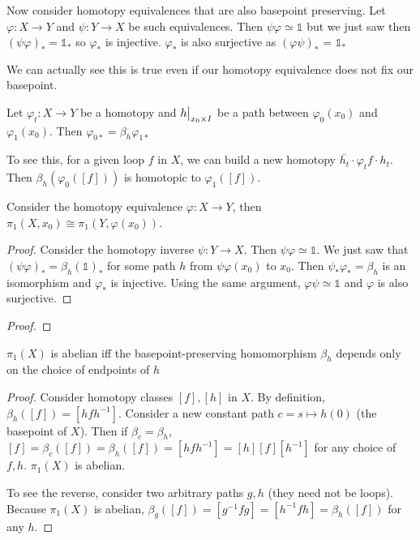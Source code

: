\documentclass[10pt]{article}
\newcommand\restr[2]{{%
  \left.\kern-\nulldelimiterspace %
  #1 %
  \vphantom{\big|} %
  \right|_{#2} %
}}
\begin{document}
Now consider homotopy equivalences that are also basepoint preserving. Let $\varphi: X \to Y$ and $\psi: Y \to X$ be such equivalences. Then $\psi\varphi \simeq \mathds{1}$ but we just saw then $(\psi\varphi)_* = \mathds{1}_*$ so $\varphi_*$ is injective. $\varphi_*$ is also surjective as $(\varphi\psi)_*$ = $\mathds{1}_*$

	We can actually see this is true even if our homotopy equivalence does not fix our basepoint.

\begin{lemma}[]
	Let $\varphi_t: X \to Y$ be a homotopy and $\restr{h}{x_0 \times I}$ be a path between $\varphi_0(x_0)$ and $\varphi_1(x_0)$. Then $\varphi_{0*} = \beta_h \varphi_{1*}$
\end{lemma}

\begin{note}
	To see this, for a given loop $f$ in $X$, we can build a new homotopy $\bar{h_t} \cdot \varphi_tf \cdot h_t$. Then $\beta_h(\varphi_0([f]))$ is homotopic to $\varphi_1([f])$.
\end{note}

\begin{theorem}
Consider the homotopy equivalence $\varphi: X \to Y$, then $\pi_1(X, x_0) \cong \pi_1(Y, \varphi(x_0))$.
\end{theorem}

\begin{proof}
	Consider the homotopy inverse $\psi: Y \to X$. Then $\psi\varphi \simeq \mathds{1}$. We just saw that $(\psi\varphi)_* = \beta_h(\mathds{1})_*$ for some path $h$ from $\psi\varphi(x_0)$ to $x_0$. Then $\psi_*\varphi_* = \beta_h$ is an isomorphism and $\varphi_*$ is injective.
	Using the same argument, $\varphi\psi \simeq \mathds{1}$ and $\varphi$ is also surjective.
\end{proof}

\begin{exercise}[]

\end{exercise}
\begin{proof}
\end{proof}

\begin{exercise}[1.1.3]
	$\pi_1(X)$ is abelian iff the basepoint-preserving homomorphism $\beta_h$ depends only on the choice of endpoints of $h$
\end{exercise}

\begin{proof}

	Consider homotopy classes $[f], [h]$ in $X$. By definition, $\beta_h([f]) = [hfh^{-1}]$. Consider a new constant path $c = s \mapsto h(0)$ (the basepoint of $X$). Then if $\beta_c = \beta_h$, $[f] = \beta_c([f]) = \beta_h([f]) = [hfh^{-1}] = [h][f][h^{-1}]$ for any choice of $f, h$. $\pi_1(X)$ is abelian.

	To see the reverse, consider two arbitrary paths $g, h$ (they need not be loops). Because $\pi_1(X)$ is abelian, $\beta_g([f]) = [g^{-1}fg] = [h^{-1}fh] = \beta_h([f])$ for any $h$.

\end{proof}
\end{document}
